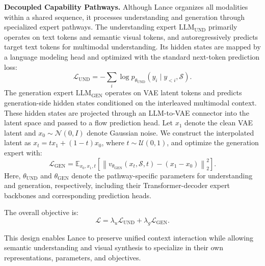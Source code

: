 \documentclass{llmxive}
\begin{document}
\textbf{Decoupled Capability Pathways.}
Although Lance organizes all modalities within a shared sequence, it processes understanding and generation through specialized expert pathways. The understanding expert $\mathrm{LLM}_{\mathrm{UND}}$ primarily operates on text tokens and semantic visual tokens, and autoregressively predicts target text tokens for multimodal understanding. Its hidden states are mapped by a language modeling head and optimized with the standard next-token prediction loss:
\begin{equation}
\mathcal{L}_{\mathrm{UND}}
= - \sum_i \log p_{\theta_{\mathrm{UND}}}(y_i \mid y_{<i}, \mathcal{S}).
\end{equation}
The generation expert $\mathrm{LLM}_{\mathrm{GEN}}$ operates on VAE latent tokens and predicts generation-side hidden states conditioned on the interleaved multimodal context. These hidden states are projected through an LLM-to-VAE connector into the latent space and passed to a flow prediction head. Let $x_1$ denote the clean VAE latent and $x_0 \sim \mathcal{N}(0, I)$ denote Gaussian noise. We construct the interpolated latent as $x_t = t x_1 + (1-t)x_0$, where $t \sim \mathcal{U}(0,1)$, and optimize the generation expert with:
\begin{equation}
\mathcal{L}_{\mathrm{GEN}} =
\mathbb{E}_{x_0, x_1, t}
\left[
\left\|
v_{\theta_{\mathrm{GEN}}}(x_t, \mathcal{S}, t) - (x_1 - x_0)
\right\|_2^2
\right].
\end{equation}
Here, $\theta_{\mathrm{UND}}$ and $\theta_{\mathrm{GEN}}$ denote the pathway-specific parameters for understanding and generation, respectively, including their Transformer-decoder expert backbones and corresponding prediction heads.

The overall objective is:
\begin{equation}
\mathcal{L}
= \lambda_u \mathcal{L}_{\mathrm{UND}}
+ \lambda_g \mathcal{L}_{\mathrm{GEN}}.
\end{equation}

This design enables Lance to preserve unified context interaction while allowing semantic understanding and visual synthesis to specialize in their own representations, parameters, and objectives.
\end{document}
